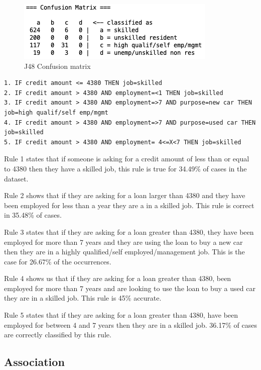 \documentclass[12pt]{article}
\begin{document}
\begin{figure}
    \centering
    \includegraphics[scale=0.75]{img/conf_matrix.png}
    \caption{J48 Confusion matrix}
    \label{fig:j48_conf_matrix}
\end{figure}

\begin{lstlisting}[caption="J48 rules"\label{fig:j48_rules}]
1. IF credit amount <= 4380 THEN job=skilled
2. IF credit amount > 4380 AND employment=<1 THEN job=skilled
3. IF credit amount > 4380 AND employment=>7 AND purpose=new car THEN job=high qualif/self emp/mgmt
4. IF credit amount > 4380 AND employment=>7 AND purpose=used car THEN job=skilled
5. IF credit amount > 4380 AND employment= 4<=X<7 THEN job=skilled
\end{lstlisting}

Rule 1 states that if someone is asking for a credit amount of less than or equal to 4380 then they have a skilled job, this rule is true for 34.49\% of cases in the dataset. 

Rule 2 shows that if they are asking for a loan larger than 4380 and they have been employed for less than a year they are a in a skilled job. This rule is correct in 35.48\% of cases.

Rule 3 states that if they are asking for a loan greater than 4380, they have been employed for more than 7 years and they are using the loan to buy a new car then they are in a highly qualified/self employed/management job. This is the case for 26.67\% of the occurrences.

Rule 4 shows us that if they are asking for a loan greater than 4380, been employed for more than 7 years and are looking to use the loan to buy a used car they are in a skilled job. This rule is 45\% accurate.

Rule 5 states that if they are asking for a loan greater than 4380, have been employed for between 4 and 7 years then they are in a skilled job. 36.17\% of cases are correctly classified by this rule.


\subsection{Association}
\end{document}
